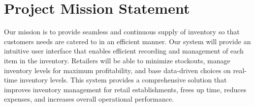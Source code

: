\section{Project Mission Statement \label{Section::projectMissionStatement}}
Our mission is to provide seamless and continuous supply of inventory so that customers needs are catered to in an efficient manner. Our system will provide an intuitive user interface that enables efficient recording and management of each item in the inventory. Retailers will be able to minimize stockouts, manage inventory levels for maximum profitability, and base data-driven choices on real-time inventory levels. This system provides a comprehensive solution that improves inventory management for retail establishments, frees up time, reduces expenses, and increases overall operational performance.



\newpage
